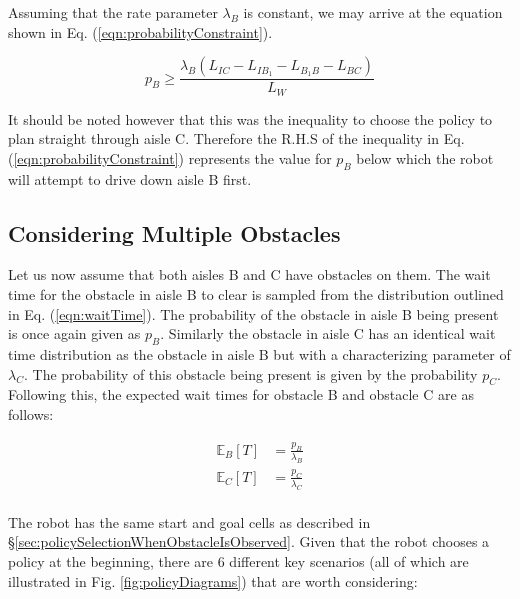 \documentclass[a4paper,12pt]{article}
\begin{document}
			Assuming that the rate parameter $\lambda_B$ is constant, we may arrive at the equation shown in Eq. (\ref{eqn:probabilityConstraint}).
			
			\begin{equation}
			p_B \geq \frac{\lambda_B\left(L_{IC}-L_{IB_1}-L_{B_1B}-L_{BC}\right)}{L_W}
			\label{eqn:probabilityConstraint}
			\end{equation}
			
			It should be noted however that this was the inequality to choose the policy to plan straight through aisle C. Therefore the R.H.S of the inequality in Eq. (\ref{eqn:probabilityConstraint}) represents the value for $p_B$ below which the robot will attempt to drive down aisle B first. 
		
		\subsection{Considering Multiple Obstacles}
		\label{sec:consideringMultipleObstacles}
		
			Let us now assume that both aisles B and C have obstacles on them. The wait time for the obstacle in aisle B to clear is sampled from the distribution outlined in Eq. (\ref{eqn:waitTime}). The probability of the obstacle in aisle B being present is once again given as $p_B$. Similarly the obstacle in aisle C has an identical wait time distribution as the obstacle in aisle B but with a characterizing parameter of $\lambda_C$. The probability of this obstacle being present is given by the probability $p_C$. Following this, the expected wait times for obstacle B and obstacle C are as follows:
			
			\begin{equation}
			\begin{split}
			\mathbb{E}_{B}[T] &= \frac{p_B}{\lambda_B} \\
			\mathbb{E}_{C}[T] &= \frac{p_C}{\lambda_C} \\
			\end{split}
			\label{eqn:expectedWaitTimeBC}
			\end{equation}
			
			The robot has the same start and goal cells as described in \S \ref{sec:policySelectionWhenObstacleIsObserved}. Given that the robot chooses a policy at the beginning, there are 6 different key scenarios (all of which are illustrated in Fig. \ref{fig:policyDiagrams}) that are worth considering:
			
\end{document}

